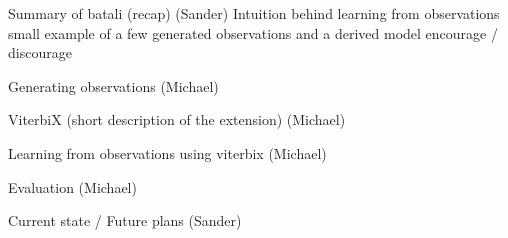 \documentclass[11pt,a4paper,xcolor=dvipsnames]{beamer}
\begin{document}
\begin{frame}
  Summary of batali (recap) (Sander)
Intuition behind learning from observations
small example of a few generated observations and a derived model
  encourage / discourage
\end{frame}

\begin{frame}
  Generating observations (Michael)
\end{frame}

\begin{frame}
  ViterbiX (short description of the extension) (Michael)
\end{frame}

\begin{frame}
  Learning from observations using viterbix (Michael)
\end{frame}

\begin{frame}
  Evaluation (Michael)
\end{frame}

\begin{frame}
  Current state / Future plans (Sander)
\end{frame}
\end{document}
